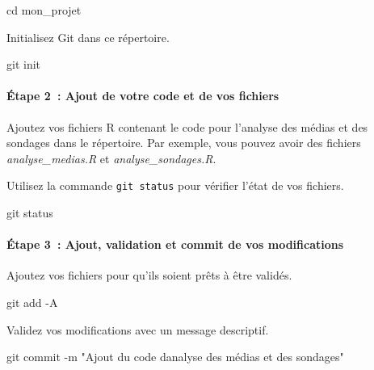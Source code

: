 \documentclass[
  letterpaper,
  DIV=11,
  numbers=noendperiod]{scrreprt}
\let\oldparagraph\paragraph
\renewcommand{\paragraph}[1]{\oldparagraph{#1}\mbox{}}
\newenvironment{Shaded}{\begin{snugshade}}{\end{snugshade}}
\newcommand{\AttributeTok}[1]{\textcolor[rgb]{0.40,0.45,0.13}{#1}}
\newcommand{\BuiltInTok}[1]{\textcolor[rgb]{0.00,0.23,0.31}{#1}}
\newcommand{\FunctionTok}[1]{\textcolor[rgb]{0.28,0.35,0.67}{#1}}
\newcommand{\NormalTok}[1]{\textcolor[rgb]{0.00,0.23,0.31}{#1}}
\newcommand{\StringTok}[1]{\textcolor[rgb]{0.13,0.47,0.30}{#1}}
\begin{document}
\begin{Shaded}
\begin{Highlighting}[]
\BuiltInTok{cd}\NormalTok{ mon\_projet}
\end{Highlighting}
\end{Shaded}

Initialisez Git dans ce répertoire.

\begin{Shaded}
\begin{Highlighting}[]
\FunctionTok{git}\NormalTok{ init}
\end{Highlighting}
\end{Shaded}

\paragraph{Étape 2~: Ajout de votre code et de vos
fichiers}\label{uxe9tape-2-ajout-de-votre-code-et-de-vos-fichiers}

Ajoutez vos fichiers R contenant le code pour l'analyse des médias et
des sondages dans le répertoire. Par exemple, vous pouvez avoir des
fichiers \emph{analyse\_medias.R} et \emph{analyse\_sondages.R}.

Utilisez la commande \texttt{git\ status} pour vérifier l'état de vos
fichiers.

\begin{Shaded}
\begin{Highlighting}[]
\FunctionTok{git}\NormalTok{ status}
\end{Highlighting}
\end{Shaded}

\paragraph{Étape 3~: Ajout, validation et commit de vos
modifications}\label{uxe9tape-3-ajout-validation-et-commit-de-vos-modifications}

Ajoutez vos fichiers pour qu'ils soient prêts à être validés.

\begin{Shaded}
\begin{Highlighting}[]
\FunctionTok{git}\NormalTok{ add }\AttributeTok{{-}A}
\end{Highlighting}
\end{Shaded}

Validez vos modifications avec un message descriptif.

\begin{Shaded}
\begin{Highlighting}[]
\FunctionTok{git}\NormalTok{ commit }\AttributeTok{{-}m} \StringTok{"Ajout du code d\textquotesingle{}analyse des médias et des sondages"}
\end{Highlighting}
\end{Shaded}
\end{document}
